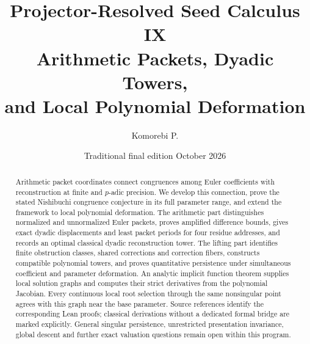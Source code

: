 \documentclass[11pt]{article}
\title{\textbf{Projector-Resolved Seed Calculus IX}\\[5pt]
  \Large Arithmetic Packets, Dyadic Towers,\\ and Local Polynomial Deformation}
\author{Komorebi P.}
\date{Traditional final edition\quad 6 October 2026}
\theoremstyle{definition}
\theoremstyle{remark}
\numberwithin{equation}{section}
\begin{document}
\maketitle
\begin{abstract}
Arithmetic packet coordinates connect congruences among Euler coefficients
with reconstruction at finite and $p$-adic precision. We develop this
connection, prove the stated Nishibuchi congruence conjecture in its full
parameter range, and extend the framework to local polynomial deformation. The arithmetic part distinguishes normalized and unnormalized
Euler packets, proves amplified difference bounds, gives exact dyadic
displacements and least packet periods for four residue addresses, and records
an optimal classical dyadic reconstruction tower. The lifting part identifies
finite obstruction classes, shared corrections and correction fibers, constructs
compatible polynomial towers, and proves quantitative persistence under
simultaneous coefficient and parameter deformation. An analytic implicit
function theorem supplies local solution graphs and computes their strict
derivatives from the polynomial Jacobian. Every continuous local root
selection through the same nonsingular point agrees with this graph near
the base parameter. Source references identify the corresponding Lean proofs;
classical derivations without a dedicated formal bridge are marked explicitly. General singular
persistence, unrestricted presentation invariance, global descent and further
exact valuation questions remain open within this program.
\end{abstract}


\clearpage
{\small\setlength{\parskip}{0pt}\tableofcontents}
\clearpage






\end{document}
